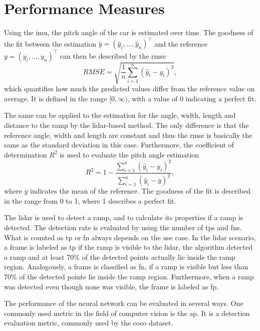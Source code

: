 \section{Performance Measures}
\label{sec:performance_measures}
Using the \gls{imu}, the pitch angle of the car is estimated over time.
The goodness of the fit between the estimation $\hat{y} = (\hat{y}_i, \dots, \hat{y}_n)^\intercal$ and the reference $y = (y_i, \dots, y_n)^\intercal$ can then be described by the \gls{rmse}
\begin{equation}
    RMSE = \sqrt{\frac{1}{n}\sum_{i = 1}^n(\hat{y}_i - y_i)^2},
\end{equation}
which quantifies how much the predicted values differ from the reference value on average.
It is defined in the range $[0, \infty)$, with a value of 0 indicating a perfect fit.\par
The same can be applied to the estimation for the angle, width, length and distance to the ramp by the \gls{lidar}-based method.
The only difference is that the reference angle, width and length are constant and thus the \gls{rmse} is basically the same as the standard deviation in this case.
Furthermore, the coefficient of determination $R^2$ is used to evaluate the pitch angle estimation
\begin{equation}
    R^2 = 1 - \frac{\sum\limits_{i = 1}^n(\hat{y}_i - y_i)^2}{\sum\limits_{i = 1}^n(\hat{y}_i - \overline{y})^2},
\end{equation}
where $\overline{y}$ indicates the mean of the reference.
The goodness of the fit is described in the range from 0 to 1, where 1 describes a perfect fit.\par
The \gls{lidar} is used to detect a ramp, and to calculate its properties if a ramp is detected.
The detection rate is evaluated by using the number of \glspl{tp} and \glspl{fn}.
What is counted as \gls{tp} or \gls{fn} always depends on the use case.
In the \gls{lidar} scenario, a frame is labeled as \gls{tp} if the ramp is visible to the \gls{lidar}, the algorithm detected a ramp and at least 70\% of the detected points actually lie inside the ramp region.
Analogously, a frame is classified as \gls{fn}, if a ramp is visible but less than 70\% of the detected points lie inside the ramp region.
Furthermore, when a ramp was detected even though none was visible, the frame is labeled as \gls{fp}.\par
The performance of the neural network can be evaluated in several ways.
One commonly used metric in the field of computer vision is the \gls{ap}.
It is a detection evaluation metric, commonly used by the \gls{coco} dataset.
